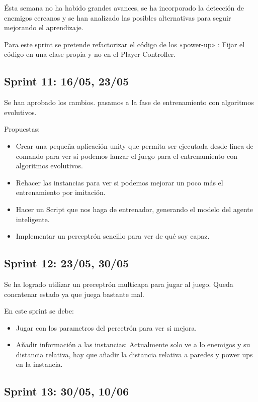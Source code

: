 Ésta semana no ha habido grandes avances, se ha incorporado la detección de enemigos cercanos y se han analizado las posibles alternativas para seguir mejorando el aprendizaje.

Para este sprint se pretende refactorizar el código de los «power-up» : Fijar el código en una clase propia y no en el Player Controller.


\subsection{Sprint 11:  16/05, 23/05}

Se han aprobado los cambios. pasamos a la fase de entrenamiento con algoritmos evolutivos.

Propuestas:
\begin{itemize}
    \item Crear una pequeña aplicación unity que permita ser ejecutada desde línea de comando para ver si podemos lanzar el juego para el entrenamiento con algoritmos evolutivos.
    \item Rehacer las instancias para ver si podemos mejorar un poco más el entrenamiento por imitación.
    \item Hacer un Script que nos haga de entrenador, generando el modelo del agente inteligente.
    \item Implementar un perceptrón sencillo para ver de qué soy capaz.
\end{itemize} 

\subsection{Sprint 12:  23/05, 30/05}

Se ha logrado utilizar un preceptrón multicapa para jugar al juego. Queda concatenar estado ya que juega bastante mal.

En este sprint se debe:
\begin{itemize}
    \item Jugar con los parametros del percetrón para ver si mejora.
    \item Añadir información a las instancias: Actualmente solo ve a lo enemigos y su distancia relativa, hay que añadir la distancia relativa a paredes y power ups en la instancia. 
\end{itemize}



\subsection{Sprint 13:  30/05, 10/06}

